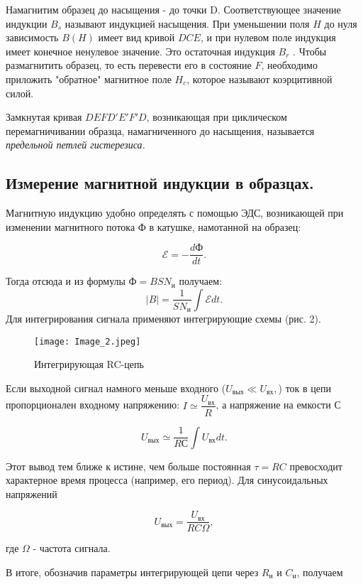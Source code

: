 Намагнитим образец до насыщения - до точки D. Соответствующее
значение индукции $B_{s}$ называют индукцией насыщения. При уменьшении поля $H$ до нуля зависимость $B(H)$ имеет вид кривой $DCE$, и при нулевом поле индукция имеет конечное ненулевое значение. Это остаточная индукция $B_{r}$ . Чтобы размагнитить образец, то есть перевести его в состояние
$F$, необходимо приложить "обратное" магнитное
поле $H_{c}$, которое называют коэрцитивной силой.

Замкнутая кривая $DEFD'E'F'D$, возникающая при циклическом
перемагничивании образца, намагниченного до насыщения, называется \textit{предельной петлей гистерезиса.}


\subsection{Измерение магнитной индукции в образцах.}
Магнитную индукцию удобно определять с помощью ЭДС, возникающей при изменении магнитного потока Ф в катушке, намотанной на образец:

$$\mathscr{E} = -\dfrac{dФ}{dt}.$$

Тогда отсюда и из формулы $Ф=BSN_{и}$ получаем:
$$|B|=\dfrac{1}{SN_{и}}\int \mathscr{E}dt.$$
Для интегрирования сигнала применяют интегрирующие схемы (рис. 2).

\begin{wrapfigure}{l}{0.6\textwidth}
	\vspace{-20pt}
	\begin{center}
		\texttt{[image: Image\_2.jpeg]}
		\label{fig:sdfsafd}
	\end{center}
	\vspace{-10pt}
	\caption{Интегрирующая RC-цепь}
\end{wrapfigure}

Если выходной сигнал намного меньше входного ($U_{вых}\ll U_{вх},$) ток в цепи пропорционален входному напряжению: $I\simeq\dfrac{U_{вх}}{R}$, а напряжение на емкости С

$$U_{вых}\simeq\dfrac{1}{RС}\int U_{вх}dt.$$

Этот вывод тем ближе к истине, чем больше постоянная $\tau=RC$ превосходит характерное время процесса (например, его период). Для синусоидальных напряжений

$$U_{вых}=\dfrac{U_{вх}}{RC\Omega},$$

где $\Omega$ - частота сигнала.

В итоге, обозначив параметры интегрирующей цепи через $R_{и}$ и $C_{и}$, получаем

